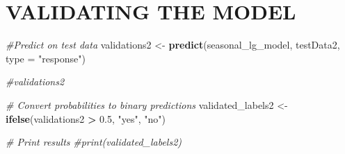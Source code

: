 \documentclass[
]{article}
\newenvironment{Shaded}{\begin{snugshade}}{\end{snugshade}}
\newcommand{\AttributeTok}[1]{\textcolor[rgb]{0.13,0.29,0.53}{#1}}
\newcommand{\CommentTok}[1]{\textcolor[rgb]{0.56,0.35,0.01}{\textit{#1}}}
\newcommand{\FloatTok}[1]{\textcolor[rgb]{0.00,0.00,0.81}{#1}}
\newcommand{\FunctionTok}[1]{\textcolor[rgb]{0.13,0.29,0.53}{\textbf{#1}}}
\newcommand{\NormalTok}[1]{#1}
\newcommand{\OtherTok}[1]{\textcolor[rgb]{0.56,0.35,0.01}{#1}}
\newcommand{\SpecialCharTok}[1]{\textcolor[rgb]{0.81,0.36,0.00}{\textbf{#1}}}
\newcommand{\StringTok}[1]{\textcolor[rgb]{0.31,0.60,0.02}{#1}}
\begin{document}
\section{VALIDATING THE MODEL}\label{validating-the-model-1}

\begin{Shaded}
\begin{Highlighting}[]
\CommentTok{\#Predict on test data}
\NormalTok{validations2 }\OtherTok{\textless{}{-}} \FunctionTok{predict}\NormalTok{(seasonal\_lg\_model, testData2, }\AttributeTok{type =} \StringTok{"response"}\NormalTok{)}

\CommentTok{\#validations2}
\end{Highlighting}
\end{Shaded}

\begin{Shaded}
\begin{Highlighting}[]
\CommentTok{\# Convert probabilities to binary predictions}
\NormalTok{validated\_labels2 }\OtherTok{\textless{}{-}} \FunctionTok{ifelse}\NormalTok{(validations2 }\SpecialCharTok{\textgreater{}} \FloatTok{0.5}\NormalTok{, }\StringTok{"yes"}\NormalTok{, }\StringTok{"no"}\NormalTok{)}

\CommentTok{\# Print results}
\CommentTok{\#print(validated\_labels2)}
\end{Highlighting}
\end{Shaded}

\begin{Shaded}
\end{Shaded}
\end{document}
